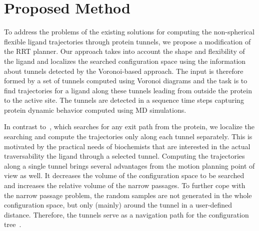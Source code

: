 \documentclass[usletter, 10pt, conference]{ieeeconf} %
\begin{document}



\section{Proposed Method}
To address the problems of the existing solutions for computing the non-spherical flexible ligand trajectories through protein tunnels, we propose a modification of the RRT planner. 
Our approach takes into account the shape and flexibility of the ligand and localizes the searched configuration space using the information about tunnels detected by the Voronoi-based approach.
The input is therefore formed by a set of tunnels computed using Voronoi diagrams and the task is to find trajectories for a ligand along these tunnels
leading from outside the protein to the active site.
The tunnels are detected in a sequence time steps capturing protein dynamic behavior computed using MD simulations. 

In contrast to~\cite{cortes2010simulating}, which searches for any exit path from the protein, we localize the searching and compute the trajectories only along each tunnel separately.
This is motivated by the practical needs of biochemists that are interested in the actual traversability the ligand through a selected tunnel.
Computing the trajectories along a single tunnel brings several advantages from the motion planning point of view as well.
It decreases the volume of the configuration space to be searched and increases the relative volume of the narrow passages.
To further cope with the narrow passage problem, the random samples are not generated in the whole configuration space, but only (mainly) around
the tunnel in a user-defined distance.
Therefore, the tunnels serve as a navigation path for the configuration tree~\cite{vonasek2009rrt}.
\end{document}

